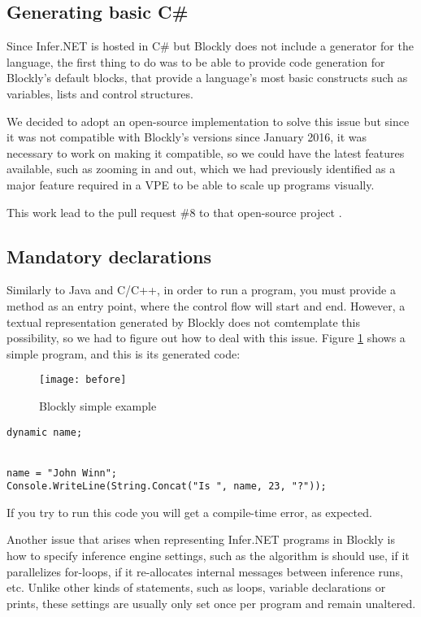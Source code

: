 \subsection{Generating basic C#}

Since Infer.NET is hosted in C# but Blockly does not include a generator for
the language, the first thing to do was to be able to provide code generation for
Blockly's default blocks, that provide a language's most basic constructs such
as variables, lists and control structures.

We decided to adopt an open-source implementation to solve this issue \cite{csgen}
but since it was not compatible with Blockly's versions since January 2016, it
was necessary to work on making it compatible, so we could have the latest features
available, such as zooming in and out, which we had previously identified as a
major feature required in a VPE to be able to scale up programs visually.

This work lead to the pull request \#8 to that open-source project \cite{csgenpr}.

\subsection{Mandatory declarations}

Similarly to Java and C/C++, in order to run a program, you must provide a method
as an entry point, where the control flow will start and end. However, a textual
representation generated by Blockly does not comtemplate this possibility, so
we had to figure out how to deal with this issue. Figure \ref{fig:before} shows a simple program,
and this is its generated code:

\begin{figure}[t]
  \begin{center}
    \leavevmode
    \texttt{[image: before]}
    \caption{Blockly simple example}
    \label{fig:before}
  \end{center}
\end{figure}

\begin{lstlisting}
dynamic name;


name = "John Winn";
Console.WriteLine(String.Concat("Is ", name, 23, "?"));
\end{lstlisting}

If you try to run this code you will get a compile-time error, as expected.

Another issue that arises when representing Infer.NET programs in Blockly is how
to specify inference engine settings, such as the algorithm is should use, if it
parallelizes for-loops, if it re-allocates internal messages between inference
runs, etc. Unlike other kinds of statements, such as loops, variable declarations
or prints, these settings are usually only set once per program and remain
unaltered.

